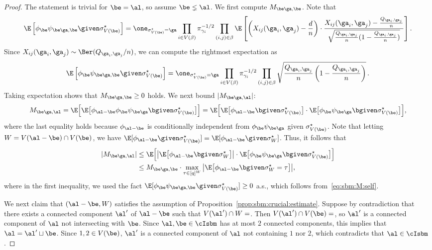 \documentclass[11pt]{article}
\begin{document}
\begin{proof}
The statement is trivial for $\be=\al$, so assume $\be\lneq \al$. We first compute $M_{\be\ga,\be}$. Note that
\[
\E\left[\phi_{\be}\psi_{\be\ga, \be}\given \sigma^\star_{V(\be)}\right]= \one_{\sigma^\star_{V(\be)}=\ga}\prod_{i\in V(\beta)}\pi_{\gamma_i}^{-1/2}\prod_{(i,j)\in \beta}\E\left[\left(X_{ij}(\ga_i,\ga_j)-\frac{d}{n}\right)\cdot \frac{X_{ij}(\ga_i,\ga_j)-\frac{Q_{\ga_i,\ga_j}}{n}}{\sqrt{\frac{Q_{\ga_i,\ga_j}}{n}(1-\frac{Q_{\ga_i,\ga_j}}{n})}}\right].
\]
Since $X_{ij}(\ga_i,\ga_j)\sim \Ber(Q_{\ga_i,\ga_j}/n)$, we can compute the rightmost expectation as
\begin{equation}\label{eq:sbm:M:self}
\E\left[\phi_{\be}\psi_{\be\ga, \be}\given \sigma^\star_{V(\be)}\right]= \one_{\sigma^\star_{V(\be)}=\ga}\prod_{i\in V(\beta)}\pi_{\gamma_i}^{-1/2}\prod_{(i,j)\in \beta}\sqrt{\frac{Q_{\ga_i,\ga_j}}{n}\left(1-\frac{Q_{\ga_i,\ga_j}}{n}\right)}\,.
\end{equation}
Taking expectation shows that $M_{\be\ga,\be}\geq 0$ holds. We next bound $|M_{\be\ga,\al}|$:
\begin{equation*}
M_{\be\ga,\al}=\E\Big[\E\big[\phi_{\al-\be}\phi_{\be}\psi_{\be\ga}\bgiven \sigma^\star_{V(\be)}\big]\Big]=\E\Big[\E\big[\phi_{\al-\be}\bgiven \sigma^\star_{V(\be)}\big]\cdot\E\big[\phi_{\be}\psi_{\be\ga}\bgiven \sigma^\star_{V(\be)}\big]\Big],
\end{equation*}
where the last equality holds because $\phi_{\al-\be}$ is conditionally independent from $\phi_{\be}\psi_{\be\ga}$ given $\sigma^\star_{V(\be)}$. Note that letting $W=V(\al-\be)\cap V(\be)$, we have $\E[\phi_{\al-\be}\given \sigma^\star_{V(\be)}]=\E[\phi_{\al-\be}\given \sigma^\star_{W}]$. Thus, it follows that
\begin{equation}\label{eq:sbm:technical}
\begin{split}
|M_{\be\ga,\al}|
&\leq \E\Big[\big|\E\big[\phi_{\al-\be}\bgiven \sigma^\star_{W}\big]\big|\cdot\E\big[\phi_{\be}\psi_{\be\ga}\bgiven \sigma^\star_{V(\be)}\big]\Big]\\
&\leq M_{\be\ga,\be}\cdot \max_{\tau\in [q]^W}\big|\E\big[\phi_{\al-\be}\bgiven \sigma^\star_{W}=\tau\big]\big|,
\end{split}
\end{equation}
where in the first inequality, we used the fact $\E[\phi_{\be}\psi_{\be\ga,\be}\given \sigma^\star_{V(\be)}]\geq 0$ a.s., which follows from~\eqref{eq:sbm:M:self}.

We next claim that $(\al-\be,W)$ satisfies the assumption of Proposition~\ref{prop:sbm:crucial:estimate}. Suppose by contradiction that there exists a connected component $\al'$ of $\al-\be$ such that $V(\al')\cap W=\empty$. Then $V(\al')\cap V(\be)=\empty$, so $\al'$ is a connected component of $\al$ not intersecting with $\be$. Since $\al,\be\in \cIsbm$ has at most $2$ connected components, this implies that $\al =\al'\sqcup \be$. Since $1,2\in V(\be)$, $\al'$ is a connected component of $\al$ not containing $1$ nor $2$, which contradicts that $\al\in \cIsbm$.


\end{proof}
\end{document}
